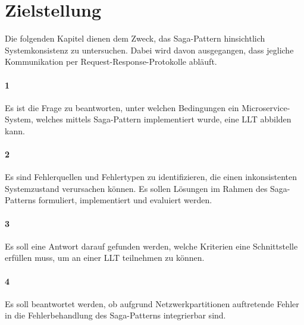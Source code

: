 \section{Zielstellung} \label{sec:zielstellung}

Die folgenden Kapitel dienen dem Zweck, das Saga-Pattern hinsichtlich Systemkonsistenz zu untersuchen. Dabei wird davon ausgegangen, dass jegliche Kommunikation per Request-Response-Protokolle abläuft. 

\paragraph*{1}
Es ist die Frage zu beantworten, unter welchen Bedingungen ein Microservice-System, welches mittels Saga-Pattern implementiert wurde, eine LLT abbilden kann. 

\paragraph*{2}
Es sind Fehlerquellen und Fehlertypen zu identifizieren, die einen inkonsistenten Systemzustand verursachen können. Es sollen Lösungen im Rahmen des Saga-Patterns formuliert, implementiert und evaluiert werden. 

\paragraph*{3}
Es soll eine Antwort darauf gefunden werden, welche Kriterien eine Schnittstelle erfüllen muss, um an einer LLT teilnehmen zu können.

\paragraph*{4}
Es soll beantwortet werden, ob aufgrund Netzwerkpartitionen auftretende Fehler in die Fehlerbehandlung des Saga-Patterns integrierbar sind. 
